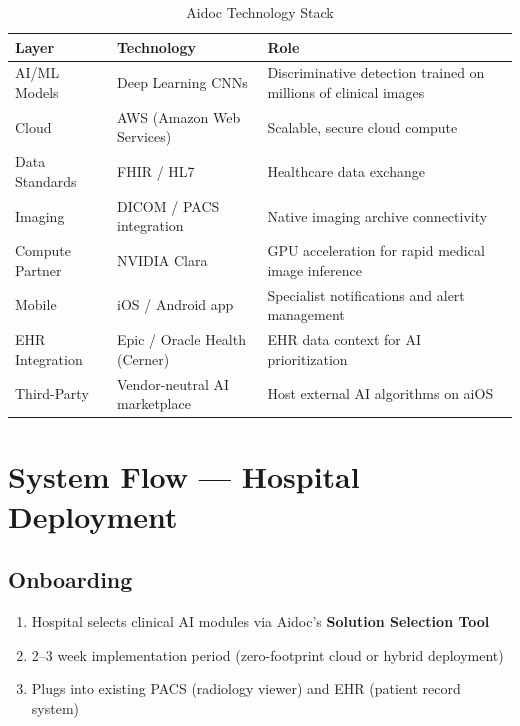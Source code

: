 \documentclass[12pt,a4paper]{article}
\begin{document}
\begin{table}[H]\centering\renewcommand{\arraystretch}{1.4}
\begin{tabularx}{\textwidth}{llX}\toprule
\textbf{Layer} & \textbf{Technology} & \textbf{Role}\\\midrule
AI/ML Models    & Deep Learning CNNs          & Discriminative detection trained on millions of clinical images \\
Cloud           & AWS (Amazon Web Services)   & Scalable, secure cloud compute \\
Data Standards  & FHIR / HL7                  & Healthcare data exchange \\
Imaging         & DICOM / PACS integration    & Native imaging archive connectivity \\
Compute Partner & NVIDIA Clara                & GPU acceleration for rapid medical image inference \\
Mobile          & iOS / Android app           & Specialist notifications and alert management \\
EHR Integration & Epic / Oracle Health (Cerner) & EHR data context for AI prioritization \\
Third-Party     & Vendor-neutral AI marketplace & Host external AI algorithms on aiOS \\
\bottomrule\end{tabularx}\caption{Aidoc Technology Stack}\end{table}

\section{System Flow --- Hospital Deployment}

\subsection{Onboarding}
\begin{enumerate}[noitemsep]
    \item Hospital selects clinical AI modules via Aidoc's \textbf{Solution Selection Tool}
    \item 2--3 week implementation period (zero-footprint cloud or hybrid deployment)
    \item Plugs into existing PACS (radiology viewer) and EHR (patient record system)
\end{enumerate}
\end{document}
